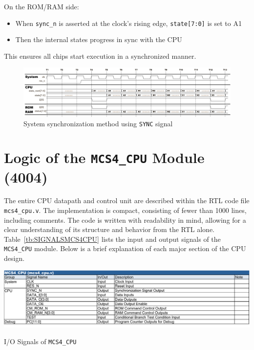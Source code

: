 On the ROM/RAM side:
\begin{itemize}
  \item When \verb|sync_n| is asserted at the clock’s rising edge, \verb|state[7:0]| is set to A1
  \item Then the internal states progress in sync with the CPU
\end{itemize}

This ensures all chips start execution in a synchronized manner.

\begin{figure}[h]
  \centering
  \includegraphics[width=1.0\textwidth]{./Figure/SyncMethod.png}
  \caption{System synchronization method using \texttt{SYNC} signal}
  \label{fig:SYNC-METHOD}
\end{figure}
\section{Logic of the \texttt{MCS4\_CPU} Module (4004)}
The entire CPU datapath and control unit are described within the RTL code file \texttt{mcs4\_cpu.v}. The implementation is compact, consisting of fewer than 1000 lines, including comments. The code is written with readability in mind, allowing for a clear understanding of its structure and behavior from the RTL alone. 
Table~\ref{tb:SIGNALSMCS4CPU} lists the input and output signals of the \texttt{MCS4\_CPU} module.
Below is a brief explanation of each major section of the CPU design.

\begin{table}[htbp]
    \includegraphics[width=1.00\columnwidth]{./Table/SignalsMCS4CPU.png}
    \caption{I/O Signals of \texttt{MCS4\_CPU}}
    \label{tb:SIGNALSMCS4CPU}
\end{table}

